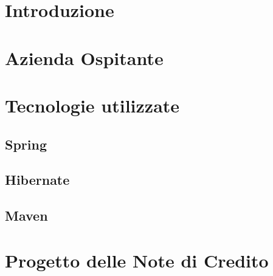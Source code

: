 \documentclass[12pt,a4paper,twoside,openright]{book}
\begin{document}
\tableofcontents

\chapter{Introduzione}
\chapter{Azienda Ospitante}
\chapter{Tecnologie utilizzate}
\section{Spring}
\section{Hibernate}
\section{Maven}
\chapter{Progetto delle Note di Credito}
\end{document}
